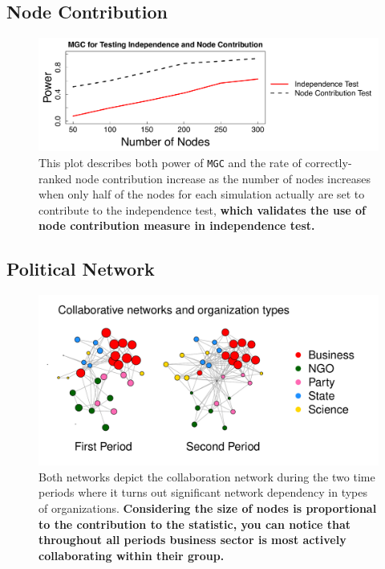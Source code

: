 \documentclass[12pt]{article}
\begin{document}
\subsection*{Node Contribution}

\begin{figure}[h]
	\centering
		\includegraphics[width=0.8\linewidth]{../Figure/nodecontri.pdf}
	\caption{This plot describes both power of \texttt{MGC} and the rate of correctly-ranked node contribution increase as the number of nodes increases when only half of the nodes for each simulation actually are set to contribute to the independence test, \textbf{which validates the use of node contribution measure in independence test.}}
	\label{fig:contribution}
\end{figure}


\subsection*{Political Network}

\begin{figure}[H]
	\centering
		\includegraphics[width=\linewidth]{../Figure/two_politics.pdf}
	\caption{Both networks depict the collaboration network during the two time periods where it turns out significant network dependency in types of organizations. \textbf{Considering the size of nodes is proportional to the contribution to the statistic, you can notice that throughout all periods business sector is most actively collaborating within their group.}}
	\label{fig:politics}
\end{figure}
\end{document}
